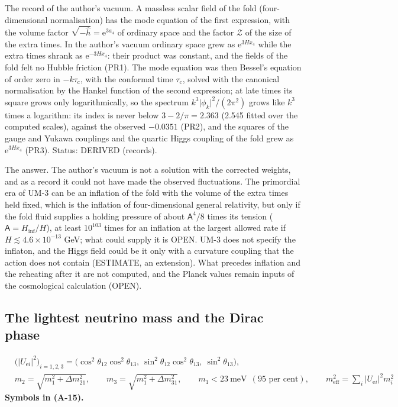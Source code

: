 \documentclass[
  10pt,
]{article}
\begin{document}
The record of the author's vacuum. A massless scalar field of the fold
(four-dimensional normalisation) has the mode equation of the first
expression, with the volume factor
\(\sqrt{-\hat h} = \mathrm{e}^{3a_4}\) of ordinary space and the factor
\(\mathcal{Z}\) of the size of the extra times. In the author's vacuum
ordinary space grew as \(\mathrm{e}^{3Hx_4}\) while the extra times
shrank as \(\mathrm{e}^{-3Hx_4}\): their product was constant, and the
fields of the fold felt no Hubble friction (PR1). The mode equation was
then Bessel's equation of order zero in \(-k\tau_{\mathrm{c}}\), with
the conformal time \(\tau_{\mathrm{c}}\), solved with the canonical
normalisation by the Hankel function of the second expression; at late
times its square grows only logarithmically, so the spectrum
\(k^3\lvert\phi_k\rvert^2/(2\pi^2)\) grows like \(k^3\) times a
logarithm: its index is never below \(3 - 2/\pi = 2.363\) (2.545 fitted
over the computed scales), against the observed \(-0.0351\) (PR2), and
the squares of the gauge and Yukawa couplings and the quartic Higgs
coupling of the fold grew as \(\mathrm{e}^{3Hx_4}\) (PR3). Status:
DERIVED (records).

The answer. The author's vacuum is not a solution with the corrected
weights, and as a record it could not have made the observed
fluctuations. The primordial era of UM-3 can be an inflation of the fold
with the volume of the extra times held fixed, which is the inflation of
four-dimensional general relativity, but only if the fold fluid supplies
a holding pressure of about \(\mathsf{A}^4/8\) times its tension
(\(\mathsf{A} = H_{\mathrm{inf}}/H\)), at least \(10^{103}\) times for
an inflation at the largest allowed rate if
\(H \lesssim 4.6\times10^{-13}\) GeV; what could supply it is OPEN. UM-3
does not specify the inflaton, and the Higgs field could be it only with
a curvature coupling that the action does not contain (ESTIMATE, an
extension). What precedes inflation and the reheating after it are not
computed, and the Planck values remain inputs of the cosmological
calculation (OPEN).

\hypertarget{the-lightest-neutrino-mass-and-the-dirac-phase}{%
\subsection{The lightest neutrino mass and the Dirac
phase}\label{the-lightest-neutrino-mass-and-the-dirac-phase}}

\[
\begin{aligned}
&\big(\lvert U_{\mathrm{e}i}\rvert^2\big)_{i = 1, 2, 3} = \big(\cos^2\theta_{12}\cos^2\theta_{13},\ \sin^2\theta_{12}\cos^2\theta_{13},\ \sin^2\theta_{13}\big),\\
&m_2 = \sqrt{m_1^2 + \Delta m^2_{21}},\qquad m_3 = \sqrt{m_1^2 + \Delta m^2_{31}},\qquad
 m_1 < 23\ \text{meV}\ \ (\text{95 per cent}),\qquad
 m_{\mathrm{eff}}^2 = \sum_i\lvert U_{\mathrm{e}i}\rvert^2m_i^2
\end{aligned} \tag{A-15}
\] \textbf{Symbols in (A-15).}
\end{document}
